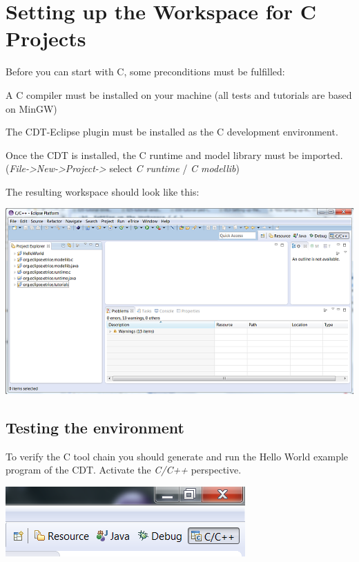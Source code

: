 \section{Setting up the Workspace for C Projects}
 
Before you can start with C, some preconditions must be fulfilled:

\begin{description}
\item{A C compiler} must be installed on your machine (all tests and tutorials are based on MinGW)
\item{The CDT-Eclipse plugin} must be installed as the C development environment.
\end{description}

Once the CDT is installed, the C runtime and model library must be imported. 
(\textit{File->New->Project->\eTrice{}} select \textit{\eTrice{} C runtime} / \textit{\eTrice{} C modellib})

The resulting workspace should look like this:

\includegraphics{images/014-SetupWorkspaceC01.png}


\subsection{Testing the environment}

To verify the C tool chain you should generate and run the Hello World example program of the CDT. 
Activate the \textit{C/C++} perspective. 

\includegraphics{images/014-SetupWorkspaceC03.png} 
 
